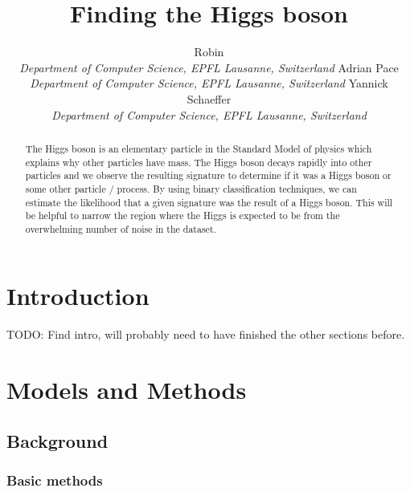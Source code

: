 \documentclass[10pt,conference,compsocconf]{IEEEtran}
\begin{document}
\title{Finding the Higgs boson}

\author{
  Robin\\
  \textit{Department of Computer Science, EPFL Lausanne, Switzerland}
  Adrian Pace\\
  \textit{Department of Computer Science, EPFL Lausanne, Switzerland}
  Yannick Schaeffer\\
  \textit{Department of Computer Science, EPFL Lausanne, Switzerland}
}

\maketitle

\begin{abstract}
 The Higgs boson is an elementary particle in the Standard Model of physics which explains why other particles have mass. The Higgs boson decays rapidly into other particles and we observe the resulting signature to determine if it was a Higgs boson or some other particle / process. By using binary classification techniques, we can estimate the likelihood that a given signature was the result of a Higgs boson. This will be helpful to narrow the region where the Higgs is expected to be from the overwhelming number of noise in the dataset.
\end{abstract}

\section{Introduction}

TODO: Find intro, will probably need to have finished the other sections before.

\section{Models and Methods}
\subsection{Background}
\subsubsection{Basic methods}
\end{document}
